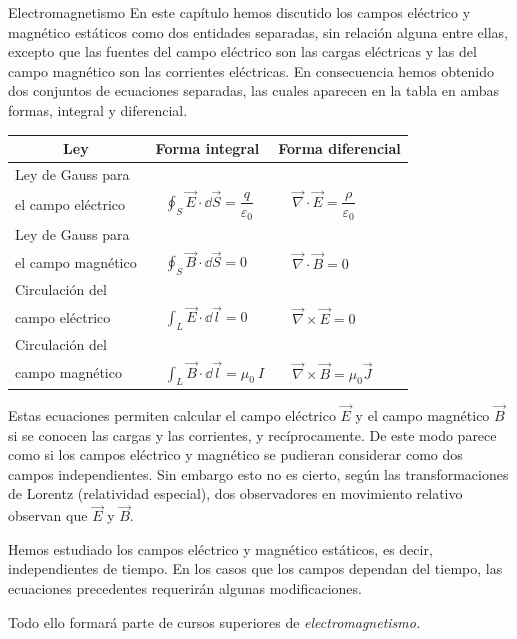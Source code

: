 \newpage %
\begin{myblock}{Electromagnetismo}
En este capítulo hemos discutido los campos eléctrico y magnético estáticos como dos entidades separadas, sin relación alguna entre ellas, excepto que las fuentes del campo eléctrico son las cargas eléctricas y las del campo magnético son las corrientes eléctricas. En consecuencia hemos obtenido dos conjuntos de ecuaciones separadas, las cuales aparecen en la tabla en ambas formas, integral y diferencial. 

\begin{table}[H]
\centering
\begin{tabular}{l|l|l}
\multicolumn{1}{c|}{\textbf{Ley}}        & \multicolumn{1}{c|}{\textbf{Forma integral}}                                     & \multicolumn{1}{c}{\textbf{Forma diferencial}}                                       \\ \hline
Ley de Gauss para \\ el campo eléctrico  & $\quad \displaystyle \oint_S \vec E \cdot \dd \vec S = \dfrac{q}{\varepsilon_0}$  & $\quad \overrightarrow{\nabla}\cdot \overrightarrow{E}=\dfrac {\rho}{\varepsilon_0}$ \\
Ley de Gauss para \\  el campo magnético  & $\quad \displaystyle \oint_S \vec B \cdot \dd \vec S = 0$                        & $\quad \overrightarrow{\nabla}\cdot \overrightarrow{B}=0$                            \\
Circulación del \\ campo eléctrico        & $\quad \displaystyle \int_L \vec E \cdot \dd \vec l = 0$                         & $\quad \overrightarrow{\nabla}\times \overrightarrow{E}=0$                           \\
Circulación del \\ campo magnético        & $\quad \displaystyle \int_L \vec B \cdot \dd \vec l = \mu_0\ I$                  & $\quad \overrightarrow{\nabla}\times \overrightarrow{B}=\mu_0 \vec J$               
\end{tabular}
\end{table}

Estas ecuaciones permiten calcular el campo eléctrico $\vec E$ y el campo magnético $\vec B$ si se conocen las cargas y las corrientes, y recíprocamente. De este modo parece como si los campos eléctrico y magnético se pudieran considerar como dos campos independientes. Sin embargo esto no es cierto, según las transformaciones de Lorentz (relatividad especial), dos observadores en movimiento relativo observan que $\vec E$ y $\vec B$.



Hemos estudiado los campos eléctrico y magnético estáticos, es decir, independientes de tiempo. En los casos que los campos dependan del tiempo, las ecuaciones precedentes requerirán algunas modificaciones. 

Todo ello formará parte de cursos superiores de \emph{electromagnetismo.}
	
\end{myblock}
